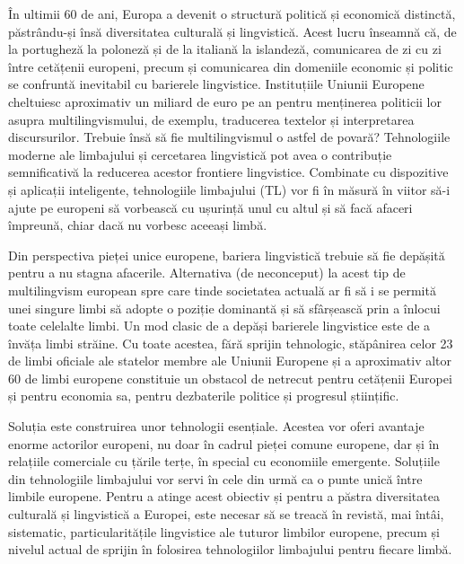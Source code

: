 \begin{multicols}{2}
În ultimii 60 de ani, Europa a devenit o structură politică și economică distinctă, păstrându-și însă diversitatea culturală și lingvistică. Acest lucru înseamnă că, de la portugheză la poloneză și de la italiană la islandeză, comunicarea de zi cu zi între cetățenii europeni, precum și comunicarea din domeniile economic și politic se confruntă inevitabil cu barierele lingvistice. Instituțiile Uniunii Europene cheltuiesc aproximativ un miliard de euro pe an pentru menținerea politicii lor asupra multilingvismului, de exemplu, traducerea textelor și interpretarea discursurilor. Trebuie însă să fie multilingvismul o astfel de povară? Tehnologiile moderne ale limbajului și cercetarea lingvistică pot avea o contribuție semnificativă la reducerea acestor frontiere lingvistice. Combinate cu dispozitive și aplicații inteligente, tehnologiile limbajului (TL) vor fi în măsură în viitor să-i ajute pe europeni să vorbească cu ușurință unul cu altul și să facă afaceri împreună, chiar dacă nu vorbesc aceeași limbă.


Din perspectiva pieței unice europene, bariera lingvistică trebuie să fie depășită pentru a nu stagna afacerile. Alternativa (de neconceput) la acest tip de multilingvism european spre care tinde societatea actuală ar fi să i se permită unei singure limbi să adopte o poziție dominantă și să sfârșească prin a înlocui toate celelalte limbi. Un mod clasic de a depăși barierele lingvistice este de a învăța limbi străine. Cu toate acestea, fără sprijin tehnologic, stăpânirea celor 23 de limbi oficiale ale statelor membre ale Uniunii Europene și a aproximativ altor 60 de limbi europene constituie un obstacol de netrecut pentru cetățenii Europei și pentru economia sa, pentru dezbaterile politice și progresul științific.

Soluția este construirea unor tehnologii esențiale. Acestea vor oferi avantaje enorme actorilor europeni, nu doar în cadrul pieței comune europene, dar și în relațiile comerciale cu țările terțe, în special cu economiile emergente. Soluțiile din tehnologiile limbajului vor servi în cele din urmă ca o punte unică între limbile europene. Pentru a atinge acest obiectiv și pentru a păstra diversitatea culturală și lingvistică a Europei, este necesar să se treacă în revistă, mai întâi, sistematic, particularitățile lingvistice ale tuturor limbilor europene, precum și nivelul actual de sprijin în folosirea tehnologiilor limbajului pentru fiecare limbă. 


\end{multicols}
